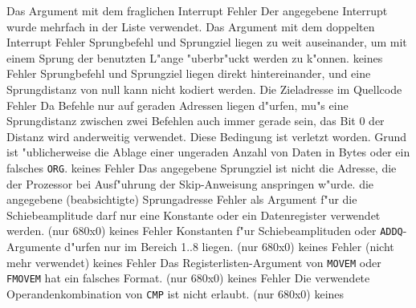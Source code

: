 \documentclass[12pt,a4paper,twoside]{report}
\newcommand{\tty}[1]{{\tt #1}}
\begin{document}
\begin{description}
               {Das Argument mit dem fraglichen Interrupt}
               {Fehler}
               {Der angegebene Interrupt wurde mehrfach in der Liste verwendet.}
               {Das Argument mit dem doppelten Interrupt}
               {Fehler}
               {Sprungbefehl und Sprungziel liegen zu weit
                auseinander, um mit einem Sprung der benutzten L"ange
                "uberbr"uckt werden zu k"onnen.}
               {keines}
               {Fehler}
               {Sprungbefehl und Sprungziel liegen direkt hintereinander,
                und eine Sprungdistanz von null kann nicht kodiert werden.}
               {Die Zieladresse im Quellcode}
               {Fehler}
               {Da Befehle nur auf geraden Adressen liegen
                d"urfen, mu"s eine Sprungdistanz zwischen zwei Befehlen
                auch immer gerade sein, das Bit 0 der Distanz wird
                anderweitig verwendet.  Diese Bedingung ist verletzt
                worden.  Grund ist "ublicherweise die Ablage einer
                ungeraden Anzahl von Daten in Bytes oder ein falsches \tty{ORG}.}
               {keines}
               {Fehler}
               {Das angegebene Sprungziel ist nicht die Adresse, die der
                Prozessor bei Ausf"uhrung der Skip-Anweisung anspringen w"urde.}
               {die angegebene (beabsichtigte) Sprungadresse}
               {Fehler}
               {als Argument f"ur die Schiebeamplitude darf nur
                eine Konstante oder ein Datenregister verwendet werden.
                (nur 680x0)}
               {keines}
               {Fehler}
               {Konstanten f"ur Schiebeamplituden oder
                \tty{ADDQ}-Argumente d"urfen nur im Bereich 1..8 liegen. (nur
                680x0)}
               {keines}
               {Fehler}
               {(nicht mehr verwendet)}
               {keines}
               {Fehler}
               {Das Registerlisten-Argument von \tty{MOVEM}
	        oder \tty{FMOVEM} hat ein falsches Format. (nur 680x0)}
               {keines}
               {Fehler}
               {Die verwendete Operandenkombination von \tty{CMP}
	        ist nicht erlaubt. (nur 680x0)}
               {keines}

\end{description}
\end{document}
